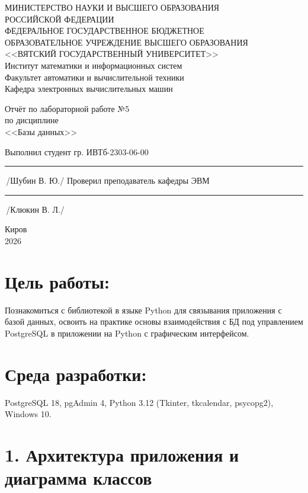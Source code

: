 \documentclass[oneside,a4paper,14pt]{extarticle}
\begin{document}
	\sloppy
	\newpage\thispagestyle{empty}
	\begin{center}
		МИНИСТЕРСТВО НАУКИ И ВЫСШЕГО ОБРАЗОВАНИЯ\\
		РОССИЙСКОЙ ФЕДЕРАЦИИ\\
		ФЕДЕРАЛЬНОЕ ГОСУДАРСТВЕННОЕ БЮДЖЕТНОЕ\\
		ОБРАЗОВАТЕЛЬНОЕ УЧРЕЖДЕНИЕ ВЫСШЕГО ОБРАЗОВАНИЯ\\
		<<ВЯТСКИЙ ГОСУДАРСТВЕННЫЙ УНИВЕРСИТЕТ>>\\
		Институт математики и информационных систем\\
		Факультет автоматики и вычислительной техники\\
		Кафедра электронных вычислительных машин
	\end{center}
	\vspace{20mm}
	\begin{center}
		Отчёт по лабораторной работе №5\\
		по дисциплине\\
		<<Базы данных>>\\
	\end{center}
	\vspace{48mm}
	\noindent
	Выполнил студент гр. ИВТб-2303-06-00 \hfill \rule[-0,5mm]{30mm}{0.15mm}\,/Шубин В. Ю./
	\newline
	Проверил преподаватель кафедры ЭВМ \hfill \rule[-0,5mm]{30mm}{0.15mm}\,/Клюкин В. Л./
	\vfill
	\begin{center}
		Киров\\
		2026
	\end{center}
	\newpage
	\thispagestyle{empty}
	\section*{Цель работы:} Познакомиться с библиотекой в языке Python для связывания приложения с базой данных, освоить на практике основы взаимодействия с БД под управлением PostgreSQL в приложении на Python с графическим интерфейсом.
	
	\section*{Среда разработки:} PostgreSQL 18, pgAdmin 4, Python 3.12 (Tkinter, tkcalendar, psycopg2), Windows 10.
	
	\newpage
	
	\section*{1. Архитектура приложения и диаграмма классов}
	
\end{document}
